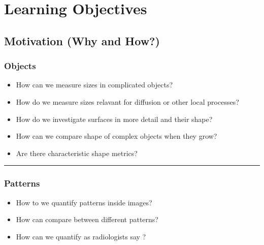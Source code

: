\documentclass[letterpaper,10pt,english]{sphinxmanual}
\begin{document}
\section{Learning Objectives}
\label{\detokenize{06-AdvancedShapeAndTexture:learning-objectives}}

\subsection{Motivation (Why and How?)}
\label{\detokenize{06-AdvancedShapeAndTexture:motivation-why-and-how}}

\subsubsection{Objects}
\label{\detokenize{06-AdvancedShapeAndTexture:objects}}\begin{itemize}
\item {} 
\sphinxAtStartPar
How can we measure sizes in complicated objects?

\item {} 
\sphinxAtStartPar
How do we measure sizes relavant for diffusion or other local processes?

\item {} 
\sphinxAtStartPar
How do we investigate surfaces in more detail and their shape?

\item {} 
\sphinxAtStartPar
How can we compare shape of complex objects when they grow?

\item {} 
\sphinxAtStartPar
Are there characteristic shape metrics?

\end{itemize}


\bigskip\hrule\bigskip



\subsubsection{Patterns}
\label{\detokenize{06-AdvancedShapeAndTexture:patterns}}\begin{itemize}
\item {} 
\sphinxAtStartPar
How to we quantify patterns inside images?

\item {} 
\sphinxAtStartPar
How can compare between different patterns?

\item {} 
\sphinxAtStartPar
How can we quantify as radiologists say ?

\end{itemize}
\end{document}
